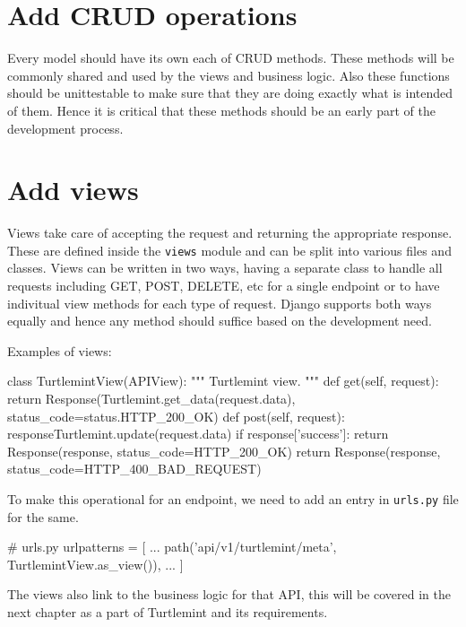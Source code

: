 \section{Add CRUD operations}
Every model should have its own each of CRUD methods. These methods will be
commonly shared and used by the views and business logic. Also these functions
should be unittestable to make sure that they are doing exactly what is
intended of them. Hence it is critical that these methods should be an early
part of the development process.

\section{Add views}
Views take care of accepting the request and returning the appropriate
response. These are defined inside the \texttt{views} module and can be split
into various files and classes. Views can be written in two ways, having a
separate class to handle all requests including GET, POST, DELETE, etc for a
single endpoint or to have indivitual view methods for each type of request.
Django supports both ways equally and hence any method should suffice based
on the development need.

Examples of views:
\begin{pythoncode}
class TurtlemintView(APIView):
    """
    Turtlemint view.
    """
    def get(self, request):
        return Response(Turtlemint.get_data(request.data),
                        status_code=status.HTTP_200_OK)
    def post(self, request):
        responseTurtlemint.update(request.data)
        if response['success']:
            return Response(response, status_code=HTTP_200_OK)
        return Response(response, status_code=HTTP_400_BAD_REQUEST)
\end{pythoncode}

To make this operational for an endpoint, we need to add an entry in
\texttt{urls.py} file for the same.

\begin{pythoncode}
# urls.py
urlpatterns = [
    ...
    path('api/v1/turtlemint/meta', TurtlemintView.as_view()),
    ...
]
\end{pythoncode}

The views also link to the business logic for that API, this will be covered
in the next chapter as a part of Turtlemint and its requirements.
